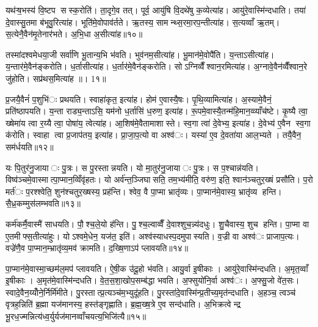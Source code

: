 यथ॑ऱ्ष॒भस्य॑ वि॒ष्टप सस्क॒रोति॑। ता॒दृगे॒व तत्। पूर्व॒ आयु॑षि वि॒दथे॑षु क॒व्येत्या॑ह। आयु॑रे॒वास्मि॑न्दधाति। तया॑ दे॒वास्सु॒तमा ब॑भूवु॒रित्या॑ह। भूति॑मे॒वोपाव॑र्तते। ऋ॒तस्य॒ सामन्थ्स॒रमा॒रप॒न्तीत्या॑ह। स॒त्यव्वाँ ऋ॒तम्। स॒त्येनै॒वैन॑मृ॒तेनार॑भते। अ॒भि॒धा अ॒सीत्या॑ह॥१०॥

तस्मा॑दश्वमेधया॒जी सर्वा॑णि भू॒तान्य॒भि भ॑वति। भुव॑नम॒सीत्या॑ह। भू॒मान॑मे॒वोपै॑ति। य॒न्ताऽसीत्या॑ह। य॒न्तार॑मे॒वैन॑ङ्करोति। ध॒र्तासीत्या॑ह। ध॒र्तार॑मे॒वैन॑ङ्करोति। सोऽग्निव्वैँश्वान॒रमित्या॑ह। अ॒ग्नावे॒वैन॑व्वैँश्वान॒रे जु॑होति। सप्र॑थस॒मित्या॑ह ॥। 1१॥

प्र॒जयै॒वैनं॑ प॒शुभि॑ः प्रथयति। स्वाहा॑कृत॒ इत्या॑ह। होम॑ ए॒वास्यै॒षः। पृ॒थि॒व्यामित्या॑ह। अ॒स्यामे॒वैनं॒ प्रति॑ष्ठापयति। य॒न्ता राड्य॒न्ताऽसि॒ यम॑नो ध॒र्तासि॑ ध॒रुण॒ इत्या॑ह। रू॒पमे॒वास्यै॒तन्म॑हि॒मान॒व्व्याँच॑ष्टे। कृ॒ष्यै त्वा॒ ख्षेमा॑य त्वा र॒य्यै त्वा॒ पोषा॑य॒ त्वेत्या॑ह। आ॒शिष॑मे॒वैतामाशास्ते। स्व॒गा त्वा॑ दे॒वेभ्य॒ इत्या॑ह। दे॒वेभ्य॑ ए॒वैन स्व॒गा क॑रोति। स्वाहा त्वा प्र॒जाप॑तय॒ इत्या॑ह। प्रा॒जा॒प॒त्यो वा अश्व॑ः। यस्या॑ ए॒व दे॒वता॑या आल॒भ्यते। तयै॒वैन॒ सम॑र्धयति॥१२॥


यः पि॒तुर॑नु॒जायाः पु॒त्रः। स पु॒रस्तान्नयति। यो मा॒तुर॑नु॒जायाः पु॒त्रः। स प॒श्चान्न॑यति। विष्व॑ञ्चमे॒वास्मात्पा॒प्मान॒व्विँवृ॑हतः। यो अर्व॑न्त॒ञ्जिघासति॒ तम॒भ्य॑मीति॒ वरु॑ण॒ इति॒ श्वान॑ञ्चतुर॒ख्षं प्रसौ॑ति। प॒रो मर्त॑ः प॒रश्श्वेति॒ शुन॑श्चतुर॒ख्षस्य॒ प्रह॑न्ति। श्वेव॒ वै पा॒प्मा भ्रातृ॑व्यः। पा॒प्मान॑मे॒वास्य॒ भ्रातृ॑व्य हन्ति। सै॒ध्र॒कम्मुस॑लम्भवति॥१३॥

कर्म॑कर्मै॒वास्मै॑ साधयति। पौ॒श्च॒ले॒यो ह॑न्ति। पु॒श्च॒ल्वाव्वैँ दे॒वाश्शुच॒न्न्य॑दधुः। शु॒चैवास्य॒ शुच हन्ति। पा॒प्मा वा ए॒तमीफ्स॒तीत्या॑हुः। योऽश्वमे॒धेन॒ यज॑त॒ इति॑। अश्व॑स्याधस्प॒दमुपास्यति। व॒ज्री वा अश्व॑ः प्राजाप॒त्यः। वज्रे॑णै॒व पा॒प्मान॒म्भ्रातृ॑व्य॒मव॑ क्रामति। द॒ख्षि॒णाऽप॑ प्लावयति॥१४॥

पा॒प्मान॑मे॒वास्मा॒च्छम॑ल॒मप॑ प्लावयति। ऐ॒षी॒क उ॑दू॒हो भ॑वति। आयु॒र्वा इ॒षीकाः। आयु॑रे॒वास्मि॑न्दधति। अ॒मृत॒व्वाँ इ॒षीकाः। अ॒मृत॑मे॒वास्मि॑न्दधति। वे॒त॒स॒शा॒खोप॒सम्ब॑द्धा भवति। अ॒फ्सुयो॑नि॒र्वा अश्व॑ः। अ॒फ्सु॒जो वे॑त॒सः। स्वादे॒वैन॒य्योँने॒र्निर्मि॑मीते। पु॒रस्तात्प्र॒त्यञ्च॑म॒भ्युदू॑हति। पु॒रस्ता॑दे॒वास्मि॑न्प्र॒तीच्य॒मृत॑न्दधाति। अ॒हञ्च॒ त्वञ्च॑ वृत्रह॒न्निति॑ ब्र॒ह्मा यज॑मानस्य॒ हस्त॑ङ्गृह्णाति। ब्र॒ह्म॒ख्ष॒त्रे ए॒व सन्द॑धाति। अ॒भिक्रत्वेन्द्र भू॒रध॒ज्मन्नित्य॑ध्व॒र्युर्यज॑मानव्वाँचयत्य॒भिजि॑त्यै॥१५॥


